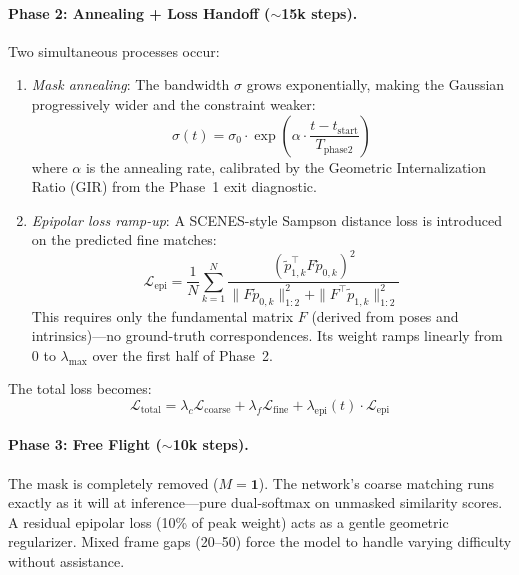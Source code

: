 \documentclass[11pt,a4paper]{article}
\begin{document}
\paragraph{Phase 2: Annealing + Loss Handoff ($\sim$15k steps).}
Two simultaneous processes occur:

\begin{enumerate}
    \item \textit{Mask annealing}: The bandwidth $\sigma$ grows exponentially, making the Gaussian progressively wider and the constraint weaker:
    \begin{equation}
        \sigma(t) = \sigma_0 \cdot \exp\!\left(\alpha \cdot \frac{t - t_{\text{start}}}{T_{\text{phase2}}}\right)
    \end{equation}
    where $\alpha$ is the annealing rate, calibrated by the Geometric Internalization Ratio (GIR) from the Phase~1 exit diagnostic.

    \item \textit{Epipolar loss ramp-up}: A SCENES-style Sampson distance loss is introduced on the predicted fine matches:
    \begin{equation}
        \mathcal{L}_{\text{epi}} = \frac{1}{N}\sum_{k=1}^{N} \frac{(\tilde{p}_{1,k}^\top F \tilde{p}_{0,k})^2}{\|F\tilde{p}_{0,k}\|_{1:2}^2 + \|F^\top\tilde{p}_{1,k}\|_{1:2}^2}
    \end{equation}
    This requires only the fundamental matrix $F$ (derived from poses and intrinsics)---no ground-truth correspondences. Its weight ramps linearly from 0 to $\lambda_{\max}$ over the first half of Phase~2.
\end{enumerate}

The total loss becomes:
\begin{equation}
    \mathcal{L}_{\text{total}} = \lambda_c \mathcal{L}_{\text{coarse}} + \lambda_f \mathcal{L}_{\text{fine}} + \lambda_{\text{epi}}(t) \cdot \mathcal{L}_{\text{epi}}
\end{equation}

\paragraph{Phase 3: Free Flight ($\sim$10k steps).}
The mask is completely removed ($M = \mathbf{1}$). The network's coarse matching runs exactly as it will at inference---pure dual-softmax on unmasked similarity scores. A residual epipolar loss (10\% of peak weight) acts as a gentle geometric regularizer. Mixed frame gaps (20--50) force the model to handle varying difficulty without assistance.
\end{document}
